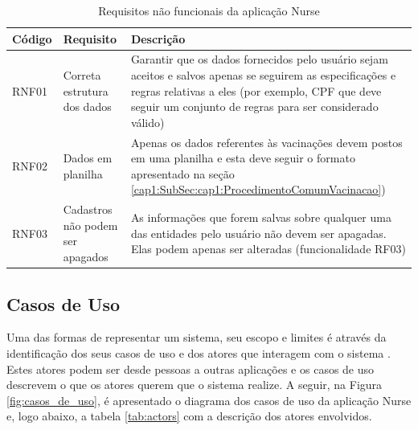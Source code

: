 \begin{table}[ht!]
  \centering
  {
  \begin{tabularx}{\textwidth}{
    | >{\centering\arraybackslash}m{} 
    | >{\centering\arraybackslash}X 
    | >{\raggedright\arraybackslash}X | }
    \hline
    \rowcolor{green!100}
    \textbf{Código} & \textbf{Requisito} & \textbf{Descrição} \\ \hline \hline
    RNF01  &  Correta estrutura dos dados              & Garantir que os dados fornecidos pelo usuário sejam aceitos e salvos apenas se seguirem as especificações e regras relativas a eles (por exemplo, CPF que deve seguir um conjunto de regras para ser considerado válido)   \\ \hline
    RNF02  &  Dados em planilha & Apenas os dados referentes às vacinações devem postos em uma planilha e esta deve seguir o formato apresentado na seção \ref{cap1:SubSec:cap1:ProcedimentoComumVacinacao}) \\ \hline
    RNF03  &  Cadastros não podem ser apagados  & As informações que forem salvas sobre qualquer uma das entidades pelo usuário não devem ser apagadas. Elas podem apenas ser alteradas (funcionalidade RF03) \\ \hline
  \end{tabularx}}
\caption{Requisitos não funcionais da aplicação Nurse}
\label{tab:rnf}
\end{table}

\subsection{Casos de Uso}
\label{cap4:Subsec:CasosDeUso}

Uma das formas de representar um sistema, seu escopo e limites é através da identificação dos seus casos de uso e dos atores que interagem com o sistema \cite{schneider2001applying}. Estes atores podem ser desde pessoas a outras aplicações e os casos de uso descrevem o que os atores querem que o sistema realize. A seguir, na Figura \ref{fig:casos_de_uso}, é apresentado o diagrama dos casos de uso da aplicação Nurse e, logo abaixo, a tabela \ref{tab:actors} com a descrição dos atores envolvidos.

